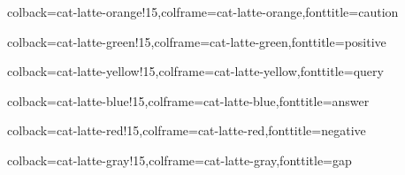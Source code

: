 \usepackage[utf8]{inputenc}
\usepackage[T1]{fontenc}
\usepackage[displaymath, mathlines,running]{lineno}
\usepackage{graphicx}
\usepackage{longtable}

\usepackage{amsmath}
\usepackage{amssymb}
\usepackage{amsthm}

\usepackage{hyperref}

\usepackage[normalem]{ulem}

\usepackage[dvipsnames]{xcolor}


\usepackage{tcolorbox}

%
{colback=cat-latte-orange!15,colframe=cat-latte-orange,fonttitle=\bfseries}{caution}

%
{colback=cat-latte-green!15,colframe=cat-latte-green,fonttitle=\bfseries}{positive}

%
{colback=cat-latte-yellow!15,colframe=cat-latte-yellow,fonttitle=\bfseries}{query}

%
{colback=cat-latte-blue!15,colframe=cat-latte-blue,fonttitle=\bfseries}{answer}

%
{colback=cat-latte-red!15,colframe=cat-latte-red,fonttitle=\bfseries}{negative}

%
{colback=cat-latte-gray!15,colframe=cat-latte-gray,fonttitle=\bfseries}{gap}

\usepackage{soul}


\newcommand{\hlred}[1]{\sethlcolor{soulred}\hl{#1}}
\newcommand{\hlgreen}[1]{\sethlcolor{soulgreen}\hl{#1}}
\newcommand{\hlyellow}[1]{\sethlcolor{soulyellow}\hl{#1}}
\newcommand{\hlblue}[1]{\sethlcolor{soulblue}\hl{#1}}
\newcommand{\hlorange}[1]{\sethlcolor{soulorange}\hl{#1}}
\newcommand{\hlgray}[1]{\sethlcolor{soulgray}\hl{#1}}

\setul{}{3pt}
\newcommand{\ulred}[1]{\setulcolor{cat-latte-red}\ul{#1}}
\newcommand{\ulgreen}[1]{\setulcolor{cat-latte-green}\ul{#1}}
\newcommand{\ulyellow}[1]{\setulcolor{cat-latte-yellow}\ul{#1}}
\newcommand{\ulblue}[1]{\setulcolor{cat-latte-blue}\ul{#1}}
\newcommand{\ulorange}[1]{\setulcolor{cat-latte-orange}\ul{#1}}
\newcommand{\ulgray}[1]{\setulcolor{cat-latte-gray}\ul{#1}}
